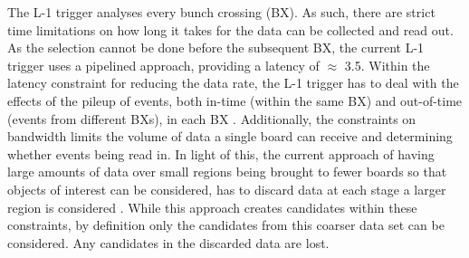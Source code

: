 The L-1 trigger analyses every bunch crossing (BX). 
As such, there are strict time limitations on how long it takes for the data can be collected and read out. 
As the selection cannot be done before the subsequent BX, the current L-1 trigger uses a pipelined approach, providing a latency of $\approx$ 3.5\mus . 
Within the latency constraint for reducing the data rate, the L-1 trigger has to deal with the effects of the pileup of events, both in-time (within the same BX) and out-of-time (events from different BXs), in each BX . 
Additionally, the constraints on bandwidth limits the volume of data a single board can receive and determining whether events being read in. 
In light of this, the current approach of having large amounts of data over small regions being brought to fewer boards so that objects of interest can be considered, has to discard data at each stage a larger region is considered . 
While this approach creates candidates within these constraints, by definition only the candidates from this coarser data set can be considered. 
Any candidates in the discarded data are lost\cite{oldcms}.